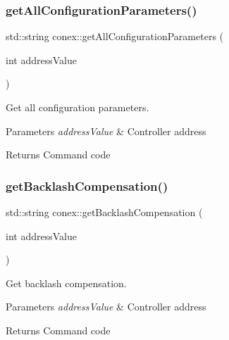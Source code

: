 \subsubsection{\texorpdfstring{get\+All\+Configuration\+Parameters()}{getAllConfigurationParameters()}}
{\footnotesize\ttfamily std\+::string conex\+::get\+All\+Configuration\+Parameters (\begin{DoxyParamCaption}\item[{int}]{address\+Value }\end{DoxyParamCaption})}



Get all configuration parameters. 


\begin{DoxyParams}{Parameters}
{\em address\+Value} & Controller address \\
\hline
\end{DoxyParams}
\begin{DoxyReturn}{Returns}
Command code 
\end{DoxyReturn}
\mbox{\label{namespaceconex_a8c9d7fa13308de3bfa68ea372986d490}} 
\subsubsection{\texorpdfstring{get\+Backlash\+Compensation()}{getBacklashCompensation()}}
{\footnotesize\ttfamily std\+::string conex\+::get\+Backlash\+Compensation (\begin{DoxyParamCaption}\item[{int}]{address\+Value }\end{DoxyParamCaption})}



Get backlash compensation. 


\begin{DoxyParams}{Parameters}
{\em address\+Value} & Controller address \\
\hline
\end{DoxyParams}
\begin{DoxyReturn}{Returns}
Command code 
\end{DoxyReturn}
\mbox{\label{namespaceconex_a09ba026f23e2caeb631a18230bcd8b45}} 
